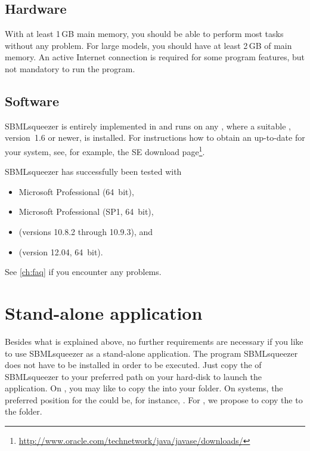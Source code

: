\subsection{Hardware}

With at least 1\,GB main memory, you should be able to perform most tasks without any problem. For large models, you should have at least 2\,GB of main memory.
An active Internet connection is required for some program features, but not mandatory to run the program. %

\subsection{Software}\label{sec:SoftwareRequirements}

SBMLsqueezer is entirely implemented in \Java and runs on any \OS, where a 
suitable \JVM, \JDK version~1.6 or newer, is installed.
For instructions how to obtain an up-to-date \JVM for your system, see, for 
example, the \Java SE download
page\footnote{\url{http://www.oracle.com/technetwork/java/javase/downloads/}\label{fn:jvmldl}}.

SBMLsqueezer has successfully been tested with
\begin{itemize}
  \item Microsoft \WindowsSeven Professional (64~bit),
  \item Microsoft \WindowsSeven Professional (SP1, 64~bit),
  \item \MacOSX (versions 10.8.2 through 10.9.3), and
  \item \UbuntuLinux (version 12.04, 64~bit).
\end{itemize}
See \vref{ch:faq} if you encounter any problems.

\section{Stand-alone application}
\label{sec:StandAlone}

Besides what is explained above, no further requirements are necessary if you
like to use SBMLsqueezer as a stand-alone application.
The program SBMLsqueezer does not have to be installed in order to be executed.
Just copy the \JAR of SBMLsqueezer to your preferred path on your hard-disk
to launch the application.
On \MacOSX, you may like to copy the \JAR into your
folder.
On \Windows systems, the preferred position for the \JAR could be, for
instance,
.
For \Linux, we propose to copy the \JAR to the  folder.


